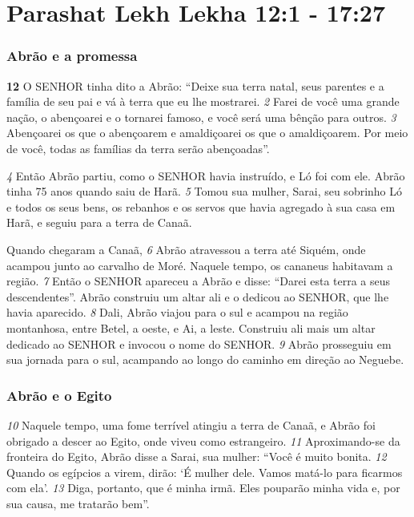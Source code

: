 \section*{Parashat Lekh Lekha 12:1 - 17:27}

\subsubsection*{Abrão e a promessa}
\textbf{\large 12}
 O SENHOR tinha dito a Abrão: “Deixe sua terra natal, seus parentes e a
família de seu pai e vá à terra que eu lhe mostrarei. 
\textit{\tiny 2}
Farei de você uma grande
nação, o abençoarei e o tornarei famoso, e você será uma bênção para outros.
\textit{\tiny 3}
Abençoarei os que o abençoarem e amaldiçoarei os que o amaldiçoarem. Por
meio de você, todas as famílias da terra serão abençoadas”.

\bigskip
\textit{\tiny 4}
Então Abrão partiu, como o SENHOR havia instruído, e Ló foi com ele. Abrão
tinha 75 anos quando saiu de Harã. 
\textit{\tiny 5}
Tomou sua mulher, Sarai, seu sobrinho Ló e
todos os seus bens, os rebanhos e os servos que havia agregado à sua casa em
Harã, e seguiu para a terra de Canaã. 

\bigskip
Quando chegaram a Canaã, 
\textit{\tiny 6}
Abrão
atravessou a terra até Siquém, onde acampou junto ao carvalho de Moré. Naquele
tempo, os cananeus habitavam a região.
\textit{\tiny 7}
Então o SENHOR apareceu a Abrão e disse: “Darei esta terra a seus
descendentes”. Abrão construiu um altar ali e o dedicou ao SENHOR, que lhe havia
aparecido. 
\textit{\tiny 8}
Dali, Abrão viajou para o sul e acampou na região montanhosa, entre
Betel, a oeste, e Ai, a leste. Construiu ali mais um altar dedicado ao SENHOR e
invocou o nome do SENHOR. 
\textit{\tiny 9}
Abrão prosseguiu em sua jornada para o sul,
acampando ao longo do caminho em direção ao Neguebe.

\bigskip
\subsubsection*{Abrão e o Egito}
\textit{\tiny 10}
Naquele tempo, uma fome terrível atingiu a terra de Canaã, e Abrão foi
obrigado a descer ao Egito, onde viveu como estrangeiro. 
\textit{\tiny 11}
Aproximando-se da
fronteira do Egito, Abrão disse a Sarai, sua mulher: “Você é muito bonita.
\textit{\tiny 12}
Quando os egípcios a virem, dirão: ‘É mulher dele. Vamos matá-lo para ficarmos
com ela’. 
\textit{\tiny 13}
Diga, portanto, que é minha irmã. Eles pouparão minha vida e, por sua
causa, me tratarão bem”.


